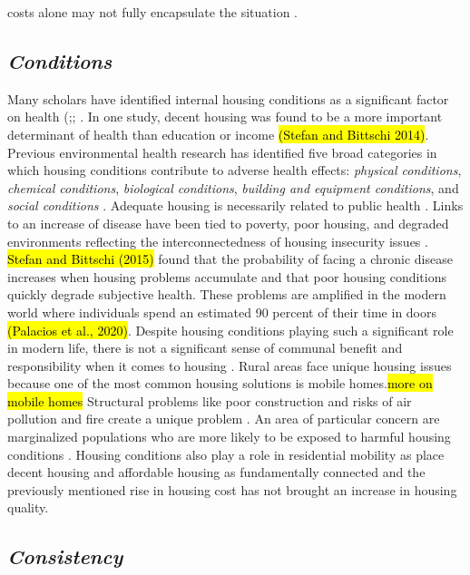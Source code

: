 costs alone may not fully encapsulate the situation \citep{kropczynski_insights_2012}. 

\subsection{\textit{Conditions}}

Many scholars have identified internal housing conditions as a significant factor on health (\citealp{braveman_housing_2011};\citealp{metzger_fair_2017}; \citealp{swope_housing_2020}. In one study, decent housing was found to be a more important determinant of health than education or income \hl{(Stefan and Bittschi 2014)}. Previous environmental health research has identified five broad categories in which housing conditions contribute to adverse health effects: \textit{physical conditions}, \textit{chemical conditions}, \textit{biological conditions}, \textit{building and equipment conditions}, and \textit{social conditions} \citep{jacobs_environmental_2011}. Adequate housing is necessarily related to public health \citep{matte_housing_2000}. Links to an increase of disease have been tied to poverty, poor housing, and degraded environments reflecting the interconnectedness of housing insecurity issues \citep{rauh_housing_2008}. \hl{Stefan and Bittschi (2015)} found that the probability of facing a chronic disease increases when housing problems accumulate and that poor housing conditions quickly degrade subjective health. These problems are amplified in the modern world where individuals spend an estimated 90 percent of their time in doors \hl{(Palacios et al., 2020)}. Despite housing conditions playing such a significant role in modern life, there is not a significant sense of communal benefit and responsibility when it comes to housing \citep{jacobs_environmental_2011}. Rural areas face unique housing issues because one of the most common housing solutions is mobile homes.\hl{more on mobile homes} Structural problems like poor construction and risks of air pollution and fire create a unique problem \citep{mactavish_policy_2006}. An area of particular concern are marginalized populations who are more likely to be exposed to harmful housing conditions \citep{swope_housing_2020}. Housing conditions also play a role in residential mobility as \citet{desmond_housing_2015} place decent housing and affordable housing as fundamentally connected and the previously mentioned rise in housing cost has not brought an increase in housing quality.  

\subsection{\textit{Consistency}} 

